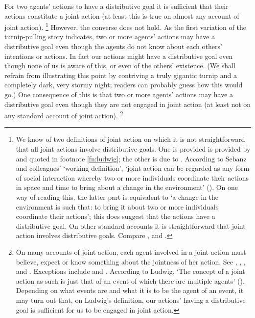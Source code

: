 \documentclass[12pt,a4paper]{extarticle}
\begin{document}
For two agents' actions to have a distributive goal it is sufficient that their actions constitute a joint action 
(at least this is true on almost any account of joint action).%
\footnote{
\label{fn:joint_action_distributive_goal}
We know of two definitions of joint action on which it is not straightforward that all joint actions involve distributive goals.
One is provided 
 is provided by \citet[p.\ 366]{ludwig_collective_2007} and quoted in footnote \vref{fn:ludwig}; the other is due to 
\citet[p.\ 70]{Sebanz:2006yq}.
According to Sebanz and colleagues' `working definition', 
`joint action can be regarded as any form of social interaction whereby two or more individuals coordinate their actions in space and time to bring about a change in the environment'
(\citeyear[p.\ 70]{Sebanz:2006yq}).
On one way of reading this, the latter part is equivalent to `a change in the environment is such that: to bring it about two or more individuals coordinate their actions';
 this does suggest that the actions have a distributive goal.
On other standard accounts it is straightforward that joint action involves distributive goals.
Compare 
	\citet[pp.\ 329-31]{Bratman:1992mi},
	\citet[pp.\ 96-7]{Searle:1990em} and
	\citet[pp.\ 168-9]{gilbert:2009shared}.
}
However, the converse does not hold.
As the first variation of the turnip-pulling story indicates,
two or more agents' actions may have a distributive goal 
even though the agents do not know about each others' intentions or actions.
In fact our actions might have a distributive goal even though none of us is aware of this, or even of the others' existence. 
(We shall refrain from illustrating this point by contriving a truly gigantic turnip and a completely dark, very stormy night; readers can probably guess how this would go.)
One consequence of this is that 
two or more agents' actions may have a distributive goal
even though they are not engaged in joint action
(at least not on any standard account of joint action).%
\footnote{
On many accounts of joint action, each agent involved in a joint action must believe, expect or know something about the jointness of her action.
See 
	\citet[p.\ 103]{Bratman:1993je}, %
	\citet[p.\ 40]{Butterfill:2011fk},
	\citet[p.\ 10]{Kutz:2000si}, %
	\citet[p. 56]{miller_social_2001} %
	and
	\citet[p.\ 361]{Roth:2004ki}. %
Exceptions include  \citet{pacherie_framing_2011} and \citet{ludwig_collective_2007}.
\label{fn:ludwig}
According to Ludwig,
`The concept of a joint action as such is just that of an event of which there are multiple agents' (\citeyear[p.\ 366]{ludwig_collective_2007}).
Depending on what events are and what it is to be the agent of an event,
it may turn out that,
on Ludwig's definition,
our actions' having a distributive goal 
is sufficient for
us to be engaged in joint action.
}
\end{document}
